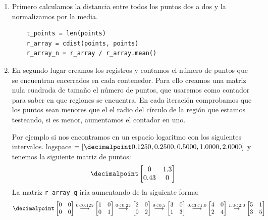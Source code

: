 \documentclass[size=a4, parskip=half, titlepage=false, toc=flat, toc=bib, 12pt]{scrartcl}
\begin{document}
\begin{enumerate}
\item Primero calculamos la distancia entre todos los puntos dos a dos y la normalizamos por la media.

\begin{verbatim}
    t_points = len(points)
    r_array = cdist(points, points)
    r_array_n = r_array / r_array.mean()
\end{verbatim}

\item En segundo lugar creamos los registros y contamos el número de puntos que se encuentran encerrados en cada contenedor. Para ello creamos una matriz nula cuadrada de tamaño el número de puntos, que usaremos como contador para saber en que regiones se encuentra. En cada iteración comprobamos que los puntos sean menores que el el radio del círculo de la región que estamos testeando, si es menor, aumentamos el contador en uno.

Por ejemplo si nos encontramos en un espacio logaritmo con los siguientes intervalos.
logspace $= [\decimalpoint 0.1250, 0.2500, 0.5000, 1.0000, 2.0000]$ y tenemos la siguiente matriz de puntos:
$$\decimalpoint \begin{bmatrix}
0 & 1.3 \\
0.43 & 0
\end{bmatrix}$$
La matriz \verb|r_array_q| iría aumentando de la siguiente forma:
$$\decimalpoint \begin{bmatrix}
0 & 0 \\
0 & 0
\end{bmatrix} \stackrel{0 < 0.125}{\longrightarrow} \begin{bmatrix}
1 & 0 \\
0 & 1
\end{bmatrix} \stackrel{0 < 0.25}{\longrightarrow} \begin{bmatrix}
2 & 0 \\
0 & 2
\end{bmatrix} \stackrel{0 < 0.5}{\longrightarrow} \begin{bmatrix}
3 & 0 \\
1 & 3
\end{bmatrix} \stackrel{0.43 < 1.0}{\longrightarrow} \begin{bmatrix}
4 & 0 \\
2 & 4
\end{bmatrix} \stackrel{1.3 < 2.0}\rightarrow \begin{bmatrix}
5 & 1 \\
3 & 5
\end{bmatrix}$$


\end{enumerate}
\end{document}
